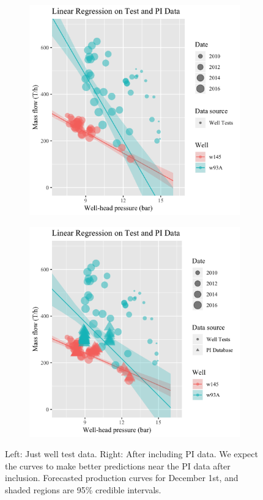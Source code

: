 \documentclass[a4paper, 12pt]{article}
\begin{document}
\begin{figure}
  \begin{subfigure}[b]{0.5\textwidth}
    \includegraphics[width=\textwidth]{media/production_curve_without}
  \end{subfigure}
  \hfill
  \begin{subfigure}[b]{0.5\textwidth}
    \includegraphics[width=\textwidth]{media/production_curve}
  \end{subfigure}
  \caption{Left: Just well test data. Right: After including PI data. We expect the curves to make better predictions near the PI data after inclusion. Forecasted production curves for December 1st, and shaded regions are 95\% credible intervals.}
  \label{fig:production_curve_comparison}
\end{figure}
\end{document}
